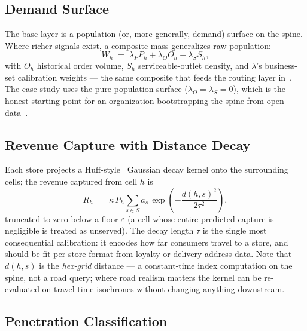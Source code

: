 \documentclass[11pt,a4paper,twocolumn]{article}
\begin{document}
\subsection{Demand Surface}

The base layer is a population (or, more generally, demand) surface on the
spine. Where richer signals exist, a composite mass generalizes raw
population:
\begin{equation}
  \label{eq:mass}
  W_h \;=\; \lambda_P P_h + \lambda_O O_h + \lambda_S S_h,
\end{equation}
with $O_h$ historical order volume, $S_h$ serviceable-outlet density, and
$\lambda$'s business-set calibration weights --- the same composite that
feeds the routing layer in~\cite{terra2026}. The case study uses the pure
population surface ($\lambda_O = \lambda_S = 0$), which is the honest
starting point for an organization bootstrapping the spine from open
data~\cite{kontur}.

\subsection{Revenue Capture with Distance Decay}

Each store projects a Huff-style~\cite{huff1964} Gaussian decay kernel
onto the surrounding cells; the revenue captured from cell $h$ is
\begin{equation}
  \label{eq:capture}
  R_h \;=\; \kappa \, P_h \sum_{s \in S} a_s\,
    \exp\!\left( -\frac{d(h,s)^2}{2\tau^2} \right),
\end{equation}
truncated to zero below a floor $\varepsilon$ (a cell whose entire
predicted capture is negligible is treated as unserved). The decay length
$\tau$ is the single most consequential calibration: it encodes how far
consumers travel to a store, and should be fit per store format from
loyalty or delivery-address data. Note that $d(h,s)$ is the \emph{hex-grid}
distance --- a constant-time index computation on the spine, not a road
query; where road realism matters the kernel can be re-evaluated on
travel-time isochrones without changing anything downstream.

\subsection{Penetration Classification}
\end{document}
